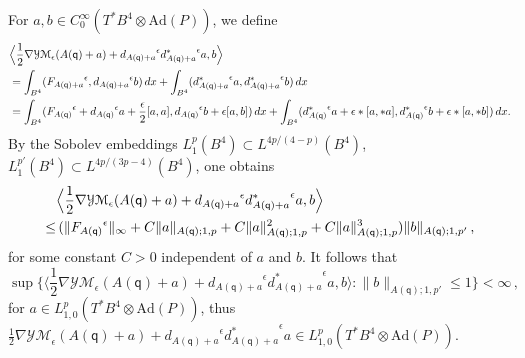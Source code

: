 \documentclass[11pt]{article}
\numberwithin{equation}{section} \setlength{\topmargin}{-35pt}
\newcommand{\Ad}{\text{Ad}}
\newcommand{\YMe}{\mathcal{YM}_{\epsilon}}
\newcommand{\q}{\mathsf{q}}
\begin{document}
 \noindent For $a,b\in C^{\infty}_0(T^{\ast}B^4\otimes\Ad(P))$, we define
  \begin{align}
&\Big\langle\frac{1}{2}\nabla\YMe(A(\q)+a)+{d_{A(\q)+a}}^{\epsilon}{d_{A(\q)+a}^{\ast}}^{\epsilon}a,b\Big\rangle\notag\\
&=\int_{B^4}({F_{A(\q)+a}}^{\epsilon},{d_{A(\q)+a}}^{\epsilon}b)\,dx+\int_{B^4}({d_{A(\q)+a}^{\ast}}^{\epsilon}a,{d_{A(\q)+a}^{\ast}}^{\epsilon}b)\,dx\notag\\
&=\int_{B^4}({F_{A(\q)}}^{\epsilon}+{d_{A(\q)}}^{\epsilon}a+\frac{\epsilon}{2}[a,a],{d_{A(\q)}}^{\epsilon}b+\epsilon[a,b])\,dx
+\int_{B^4}({d_{A(\q)}^{\ast}}^{\epsilon}a+\epsilon\ast[a,\ast
a],{d_{A(\q)}^{\ast}}^{\epsilon}b+\epsilon\ast[a,\ast b])\,dx.\notag
 \end{align}
By the Sobolev embeddings $L^p_1(B^4)\subset L^{4p/(4-p)}(B^4)$,
$L^{p'}_1(B^4)\subset L^{4p/(3p-4)}(B^4)$, one obtains
 \begin{align}
 \label{smoothH}
&\Big\langle\frac{1}{2}\nabla\YMe(A(\q)+a)+{d_{A(\q)+a}}^{\epsilon}{d_{A(\q)+a}^{\ast}}^{\epsilon}a,b\Big\rangle\notag\\
\le &\,
(\|{F_{A(\q)}}^{\epsilon}\|_{\infty}+C\|a\|_{A(\q);1,p}+C\|a\|_{A(\q);1,p}^2+C\|a\|_{A(\q);1,p}^3)\|b\|_{A(\q);1,p'}\,,
 \end{align}
 for some constant $C>0$ independent of $a$ and $b$. It follows
 that
 $$ \sup\Big\{\Big\langle\frac{1}{2}\nabla\YMe(A(\q)+a)+{d_{A(\q)+a}}^{\epsilon}{d_{A(\q)+a}^{\ast}}^{\epsilon}a,b\Big\rangle:\|b\|_{A(\q);1,p'}\le1\Big\}<\infty\,,$$
 for $a\in L^p_{1,0}(T^{\ast}B^4\otimes\Ad(P))$, thus
 $\frac{1}{2}\nabla\YMe(A(\q)+a)+{d_{A(\q)+a}}^{\epsilon}{d_{A(\q)+a}^{\ast}}^{\epsilon}a\in L^p_{1,0}(T^{\ast}B^4\otimes\Ad(P)).$
\end{document}
